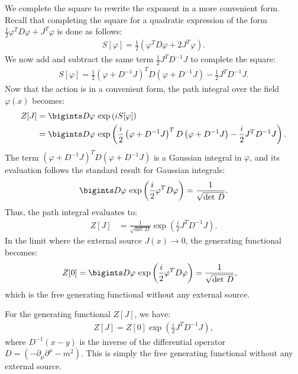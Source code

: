 We complete the square to rewrite the exponent in a more convenient form. Recall that completing the square for a quadratic expression of the form $\displaystyle\frac{1}{2} \varphi^T D \varphi + J^T \varphi$ is done as follows:
\begin{align*}
    S[\varphi] = \frac{1}{2} \left( \varphi^T D \varphi + 2 J^T \varphi \right). 
\end{align*}
We now add and subtract the same term $\displaystyle\frac{1}{2} J^T D^{-1} J$ to complete the square:
\begin{align}
    S[\varphi] = \frac{1}{2} \left( \varphi + D^{-1} J \right)^T D \left( \varphi + D^{-1} J \right) - \frac{1}{2} J^T D^{-1} J. 
\end{align}
Now that the action is in a convenient form, the path integral over the field $\varphi(x)$ becomes:
\begin{align}
    Z[J] &= \bigints D\varphi \, \exp \left( i S[\varphi] \right) \notag \\
    &= \bigints D\varphi \, \exp \left( \frac{i}{2} \left( \varphi + D^{-1} J \right)^T D \left( \varphi + D^{-1} J \right) - \frac{i}{2} J^T D^{-1} J \right). 
\end{align}
The term $\displaystyle\left( \varphi + D^{-1} J \right)^T D \left( \varphi + D^{-1} J \right)$ is a Gaussian integral in $\varphi$, and its evaluation follows the standard result for Gaussian integrals:
\begin{align}
    \bigints D\varphi \, \exp \left( \frac{i}{2} \varphi^T D \varphi \right) = \frac{1}{\sqrt{\text{det }D}}.
\end{align}
Thus, the path integral evaluates to:
\begin{align}
    Z[J] &= \frac{1}{\sqrt{\text{det }D}} \exp \left( \frac{i}{2} J^T D^{-1} J \right).
\end{align}
In the limit where the external source $J(x) \to 0$, the generating functional becomes:
\begin{align}
    Z[0] &= \bigints D\varphi \, \exp \left( \frac{i}{2} \varphi^T D \varphi \right) = \frac{1}{\sqrt{\text{det }D}},
\end{align}
which is the free generating functional without any external source.

For the generating functional $Z[J]$, we have:
\begin{align}
    Z[J] = Z[0] \exp \left( \frac{i}{2} J^T D^{-1} J \right),\label{eq:Z[J]-generating-functional}
\end{align}
where $D^{-1}(x - y)$ is the inverse of the differential operator $D = \left( -\partial_\mu \partial^\mu - m^2 \right)$. This is simply the free generating functional without any external source.

